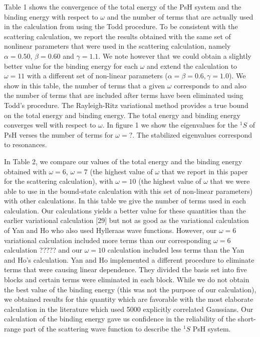\documentclass[preprint,showpacs,preprintnumbers,amsmath,amssymb]{revtex4}
\begin{document}
Table 1 shows the convergence of the total
energy of the PsH system and the binding energy
with respect to $\omega$ and the number of terms
that are actually used in the calculation
from using the Todd procedure. 
To be consistent with the scattering calculation,
we report the results obtained with
the same set of nonlinear parameters
that were used in the scattering calculation,
namely $\alpha =0.50$, $\beta=0.60$ and $\gamma=1.1$.
We note however that we could obtain a slightly better
value for the binding energy for each $\omega$ and extend
the calculation to $\omega =11$ with a
different set of non-linear parameters
($\alpha = \beta =0.6, \gamma =1.0$).
We show in this table, the number of terms that
a given $\omega$ corresponds to
and also the number of terms that are
included after terms have been eliminated using Todd's procedure.
The Rayleigh-Ritz variational method provides
a true bound on the total energy and binding
energy.
The total energy and binding energy
converges well with respect to $\omega$.
In figure 1 we show the eigenvalues for the $^1S$ of PsH
verses the number of terms for $\omega =?$.
The stabilized eigenvalues correspond to
resonances.


In Table 2, we compare our values of the total
energy and
the binding energy obtained with $\omega=6$, $\omega=7$ (the highest
value of $\omega$ that we report in this paper for
the scattering calculation), with $\omega=10$ (the highest
value of $\omega$ that we were able to use in the
bound-state calculation with this set of
non-linear parameters) with other calculations.
In this table we give the number of terms used
in each calculation.
Our calculations yields a better value for these
quantities than the earlier variational calculation [29]
but not as good as the variational calculation of
Yan and Ho who also used Hylleraas wave functions.
However, our $\omega=6$ variational calculation included
more terms than our corresponding $\omega=6$ calculation ?????
and our $\omega=10$ calculation included less terms than
the Yan and Ho's calculation.
Yan and Ho implemented a different procedure
to  eliminate terms that were causing linear dependence.
They divided the basis set into
five blocks and certain terms were eliminated in each block.
While we do not obtain the best value of the binding energy
(this was not the purpose of our calculation),
we obtained results for this quantity which are favorable with
the most elaborate calculation in the literature which
used 5000 explicitly correlated Gaussians.
Our calculation of the binding energy gave us confidence
in the reliability of the short-range part of the
scattering wave function to describe
the $^1S$ PsH system.
 
\end{document}
